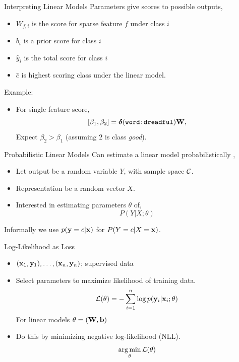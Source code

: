 \documentclass{beamer}
\begin{document}
\begin{frame}{Interpreting Linear Models}
  Parameters give scores to possible outputs,
  \begin{itemize}
  \item $W_{f, i}$ is the score for sparse feature $f$ under class $i$
  \item $b_i$ is a prior score for class $i$  
  \item $\hat{y}_i$ is the total score for class $i$
  \item $\hat{c}$ is highest scoring class under the linear model.
  \end{itemize}

  Example:
  \begin{itemize}
  \item For single feature score, \[[\beta_1, \beta_2 ] = \boldsymbol{\delta}(\texttt{word:dreadful}) \mathbf{W},\]
    Expect $\beta_2 > \beta_1$ (assuming $2$ is class \textit{good}). 
    
  \end{itemize}
\end{frame}



\begin{frame}{Probabilistic Linear Models} 
  Can estimate a linear model probabilistically ,

  \begin{itemize}
  \item Let output be a random variable $Y$, with sample space $\mathcal{C}$. 
  \item Representation be a random vector $X$. 
  \item Interested in estimating parameters $\theta$ of, 
    \[ P(Y | X; \theta) \] 
  \end{itemize}
  Informally we use $p(\mathbf{y}=c | \mathbf{x})$ for 
  $P(Y = c | X = \mathbf{x})$.
  
\end{frame}



\begin{frame}{Log-Likelihood as Loss } 
  \begin{itemize}
  \item $(\mathbf{x}_1, \mathbf{y}_1), \ldots, (\mathbf{x}_n, \mathbf{y}_n)$; supervised data
  \item Select parameters to maximize likelihood of training data.
    \[ \mathcal{L}(\theta) =  - \sum_{i=1}^n \log p(\mathbf{y}_i | \mathbf{x}_i; \theta) \] 
  For linear models $\theta = (\mathbf{W}, \mathbf{b})$ 

  \item Do this by minimizing negative log-likelihood (NLL).
    \[ \argmin_\theta \mathcal{L}(\theta)\] 
  \end{itemize}
\end{frame}
\end{document}
